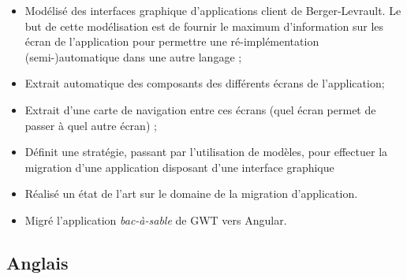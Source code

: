 \begin{itemize}
\tightlist
\item
  Modélisé des interfaces graphique d'applications client de
  Berger-Levrault. Le but de cette modélisation est de fournir le
  maximum d'information sur les écran de l'application pour permettre
  une ré-implémentation (semi-)automatique dans une autre langage ;
\item
  Extrait automatique des composants des différents écrans de
  l'application;
\item
  Extrait d'une carte de navigation entre ces écrans (quel écran permet
  de passer à quel autre écran) ;
\item
  Définit une stratégie, passant par l'utilisation de modèles, pour
  effectuer la migration d'une application disposant d'une interface
  graphique
\item
  Réalisé un état de l'art sur le domaine de la migration d'application.
\item
  Migré l'application \emph{bac-à-sable} de GWT vers Angular.
\end{itemize}

\hypertarget{anglais}{%
\subsection*{Anglais}\label{anglais}}

